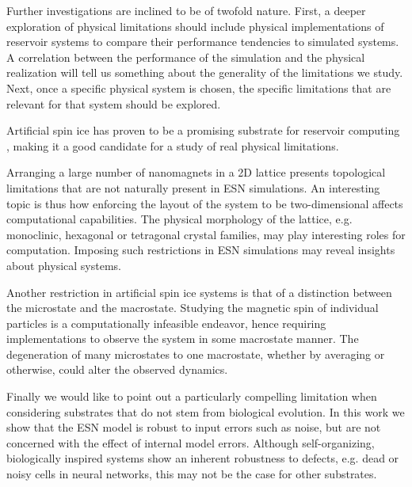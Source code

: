 Further investigations are inclined to be of twofold nature. First, a deeper
exploration of physical limitations should include physical implementations of
reservoir systems to compare their performance tendencies to simulated
systems. A correlation between the performance of the simulation and the
physical realization will tell us something about the generality of the
limitations we study. Next, once a specific physical system is chosen, the
specific limitations that are relevant for that system should be explored.

Artificial spin ice has proven to be a promising substrate for reservoir
computing \cite{jensen_computation_2018}, making it a good candidate for a study
of real physical limitations.

Arranging a large number of nanomagnets in a 2D lattice presents topological
limitations that are not naturally present in ESN simulations. An interesting
topic is thus how enforcing the layout of the system to be two-dimensional
affects computational capabilities. The physical morphology of the lattice,
e.g. monoclinic, hexagonal or tetragonal crystal families, may play interesting
roles for computation. Imposing such restrictions in ESN simulations may reveal
insights about physical systems.

Another restriction in artificial spin ice systems is that of a distinction
between the microstate and the macrostate. Studying the magnetic spin of
individual particles is a computationally infeasible endeavor, hence requiring
implementations to observe the system in some macrostate manner. The
degeneration of many microstates to one macrostate, whether by averaging or
otherwise, could alter the observed dynamics.

Finally we would like to point out a particularly compelling limitation when
considering substrates that do not stem from biological evolution. In this work
we show that the ESN model is robust to input errors such as noise, but are not
concerned with the effect of internal model errors. Although self-organizing,
biologically inspired systems show an inherent robustness to defects, e.g. dead
or noisy cells in neural networks, this may not be the case for other
substrates.

